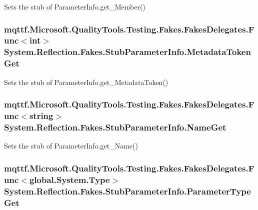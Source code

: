 Sets the stub of Parameter\-Info.\-get\-\_\-\-Member()

\hypertarget{class_system_1_1_reflection_1_1_fakes_1_1_stub_parameter_info_a5acaa463553dfdb8f79954957e48a539}{
\subsubsection[{Metadata\-Token\-Get}]{\setlength{\rightskip}{0pt plus 5cm}mqttf.\-Microsoft.\-Quality\-Tools.\-Testing.\-Fakes.\-Fakes\-Delegates.\-Func$<$int$>$ System.\-Reflection.\-Fakes.\-Stub\-Parameter\-Info.\-Metadata\-Token\-Get}}\label{class_system_1_1_reflection_1_1_fakes_1_1_stub_parameter_info_a5acaa463553dfdb8f79954957e48a539}


Sets the stub of Parameter\-Info.\-get\-\_\-\-Metadata\-Token()

\hypertarget{class_system_1_1_reflection_1_1_fakes_1_1_stub_parameter_info_ad962edefdd794a8cfe7fc9c19a42922a}{
\subsubsection[{Name\-Get}]{\setlength{\rightskip}{0pt plus 5cm}mqttf.\-Microsoft.\-Quality\-Tools.\-Testing.\-Fakes.\-Fakes\-Delegates.\-Func$<$string$>$ System.\-Reflection.\-Fakes.\-Stub\-Parameter\-Info.\-Name\-Get}}\label{class_system_1_1_reflection_1_1_fakes_1_1_stub_parameter_info_ad962edefdd794a8cfe7fc9c19a42922a}


Sets the stub of Parameter\-Info.\-get\-\_\-\-Name()

\hypertarget{class_system_1_1_reflection_1_1_fakes_1_1_stub_parameter_info_a5419df1ede1af123875819146dfcba8a}{
\subsubsection[{Parameter\-Type\-Get}]{\setlength{\rightskip}{0pt plus 5cm}mqttf.\-Microsoft.\-Quality\-Tools.\-Testing.\-Fakes.\-Fakes\-Delegates.\-Func$<$global.\-System.\-Type$>$ System.\-Reflection.\-Fakes.\-Stub\-Parameter\-Info.\-Parameter\-Type\-Get}}\label{class_system_1_1_reflection_1_1_fakes_1_1_stub_parameter_info_a5419df1ede1af123875819146dfcba8a}


